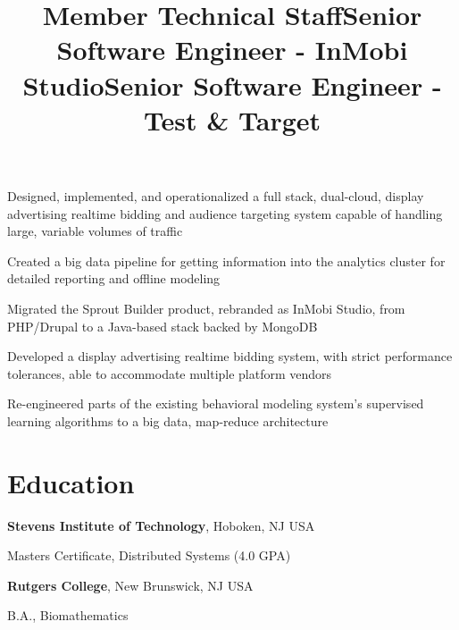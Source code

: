 \documentclass[margin,line]{resume}
\newenvironment{bullet-list}{
  \begin{list}{$\bullet$}{%
      \setlength{\itemsep}{0in}
      \setlength{\parsep}{0in} \setlength{\parskip}{0in}
      \setlength{\topsep}{0in} \setlength{\partopsep}{0in}
      \setlength{\leftmargin}{0.2in}}}{\end{list}}
\begin{document}
\begin{resume}
\title{Member Technical Staff}
\begin{position}
\vspace{-.3cm}
\begin{bullet-list}
\item Designed, implemented, and operationalized a full
stack, dual-cloud, display advertising realtime bidding and audience
targeting system capable of handling large, variable volumes of traffic
\item Created a big data pipeline for getting information
into the analytics cluster for detailed reporting and offline modeling
\end{bullet-list}
\end{position}

\title{Senior Software Engineer - InMobi Studio}
\begin{position}
\vspace{-.3cm}
\begin{bullet-list}
\item Migrated the Sprout Builder product, rebranded as InMobi Studio,
from PHP/Drupal to a Java-based stack backed by MongoDB
\end{bullet-list}
\end{position}

\title{Senior Software Engineer - Test \& Target}
\begin{position}
\vspace{-.3cm}
\begin{bullet-list}
\item Developed a display advertising realtime bidding system, with strict
performance tolerances, able to accommodate multiple platform vendors
\item Re-engineered parts of the existing behavioral modeling system's supervised
learning algorithms to a big data, map-reduce architecture
\end{bullet-list}
\end{position}

\section{\sc Education}
{\bf Stevens Institute of Technology}, Hoboken, NJ USA\\
\vspace*{-.1in}
\begin{list1}
\item[] Masters Certificate, Distributed Systems  (4.0 GPA)
\end{list1}

{\bf Rutgers College}, New Brunswick, NJ USA\\
\vspace*{-.1in}
\begin{list1}
\item[] B.A., Biomathematics
\end{list1}

\end{resume}
\end{document}
